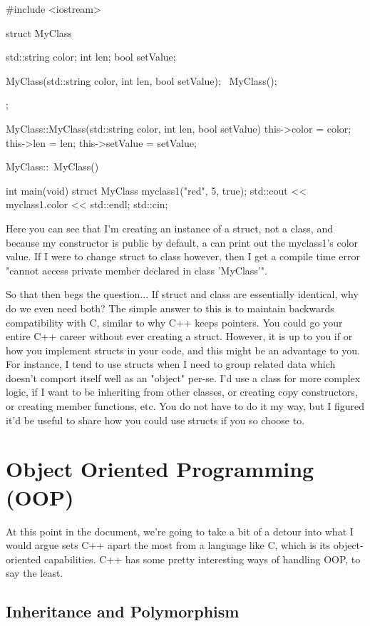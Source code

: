 \documentclass{article}
\begin{document}
\begin{cpplst}
#include <iostream>

struct MyClass {
    std::string color;
	int len;
	bool setValue;

	MyClass(std::string color, int len, bool setValue);
	~MyClass();
};

MyClass::MyClass(std::string color, int len, bool setValue)
{
    this->color = color;
	this->len = len;
	this->setValue = setValue;
}

MyClass::~MyClass()
{}

int main(void)
{
    struct MyClass myclass1("red", 5, true);
	std::cout << myclass1.color << std::endl;
	std::cin;
}
\end{cpplst}

Here you can see that I'm creating an instance of a struct, not a class, and because my constructor is public
by default, a can print out the myclass1's color value. If I were to change struct to class however, then I
get a compile time error "cannot access private member declared in class 'MyClass'".

So that then begs the question... If struct and class are essentially identical, why do we even need both? The
simple answer to this is to maintain backwards compatibility with C, similar to why C++ keeps pointers. You
could go your entire C++ career without ever creating a struct. However, it is up to you if or how you
implement structs in your code, and this might be an advantage to you. For instance, I tend to use structs
when I need to group related data which doesn't comport itself well as an "object" per-se. I'd use a class for
more complex logic, if I want to be inheriting from other classes, or creating copy constructors, or creating
member functions, etc. You do not have to do it my way, but I figured it'd be useful to share how you could
use structs if you so choose to.

\section{Object Oriented Programming (OOP)}

At this point in the document, we're going to take a bit of a detour into what I would argue sets C++ apart
the most from a language like C, which is its object-oriented capabilities. C++ has some pretty interesting
ways of handling OOP, to say the least.

\subsection{Inheritance and Polymorphism}
\end{document}

